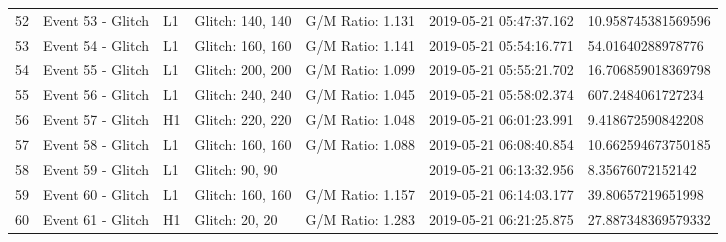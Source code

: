 \begin{longtable}{lllllll}
52 &                                  Event 53 - Glitch &       L1 &  Glitch: 140, 140 &  G/M Ratio: 1.131 &  2019-05-21 05:47:37.162 &  10.958745381569596 \\
53 &                                  Event 54 - Glitch &       L1 &  Glitch: 160, 160 &  G/M Ratio: 1.141 &  2019-05-21 05:54:16.771 &   54.01640288978776 \\
54 &                                  Event 55 - Glitch &       L1 &  Glitch: 200, 200 &  G/M Ratio: 1.099 &  2019-05-21 05:55:21.702 &  16.706859018369798 \\
55 &                                  Event 56 - Glitch &       L1 &  Glitch: 240, 240 &  G/M Ratio: 1.045 &  2019-05-21 05:58:02.374 &   607.2484061727234 \\
56 &                                  Event 57 - Glitch &       H1 &  Glitch: 220, 220 &  G/M Ratio: 1.048 &  2019-05-21 06:01:23.991 &   9.418672590842208 \\
57 &                                  Event 58 - Glitch &       L1 &  Glitch: 160, 160 &  G/M Ratio: 1.088 &  2019-05-21 06:08:40.854 &  10.662594673750185 \\
58 &                                  Event 59 - Glitch &       L1 &    Glitch: 90, 90 &                   &  2019-05-21 06:13:32.956 &    8.35676072152142 \\
59 &                                  Event 60 - Glitch &       L1 &  Glitch: 160, 160 &  G/M Ratio: 1.157 &  2019-05-21 06:14:03.177 &   39.80657219651998 \\
60 &                                  Event 61 - Glitch &       H1 &    Glitch: 20, 20 &  G/M Ratio: 1.283 &  2019-05-21 06:21:25.875 &  27.887348369579332 \\
\bottomrule
\end{longtable}
